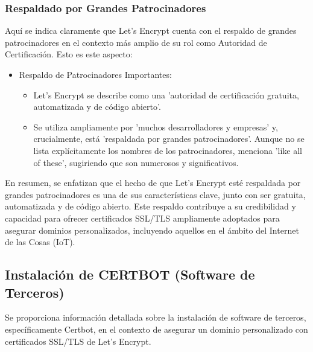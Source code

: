 \documentclass{report}
\begin{document}
\subsubsection{Respaldado por Grandes Patrocinadores}
Aquí se indica claramente que Let's Encrypt cuenta con el respaldo de grandes patrocinadores en el contexto 
más amplio de su rol como Autoridad de Certificación.
Esto es este aspecto:
\begin{itemize}
    \item Respaldo de Patrocinadores Importantes:
        \begin{itemize}
            \item Let's Encrypt se describe como una 'autoridad de certificación gratuita, automatizada y de código abierto'.
            \item Se utiliza ampliamente por 'muchos desarrolladores y empresas' y, crucialmente, está 'respaldada por grandes 
            patrocinadores'. Aunque no se  lista explícitamente los nombres de los patrocinadores, menciona 'like all of these', 
            sugiriendo que son numerosos y significativos.
        \end{itemize}
\end{itemize}
En resumen, se  enfatizan que el hecho de que Let's Encrypt esté respaldada por grandes patrocinadores es una de 
sus características clave, junto con ser gratuita, automatizada y de código abierto. Este respaldo contribuye a su 
credibilidad y capacidad para ofrecer certificados SSL/TLS ampliamente adoptados para asegurar dominios personalizados, 
incluyendo aquellos en el ámbito del Internet de las Cosas (IoT).

\subsection{Instalación de CERTBOT (Software de Terceros)}
Se proporciona información detallada sobre la instalación de software de terceros, específicamente Certbot, en el contexto 
de asegurar un dominio personalizado con certificados SSL/TLS de Let's Encrypt.
\end{document}
